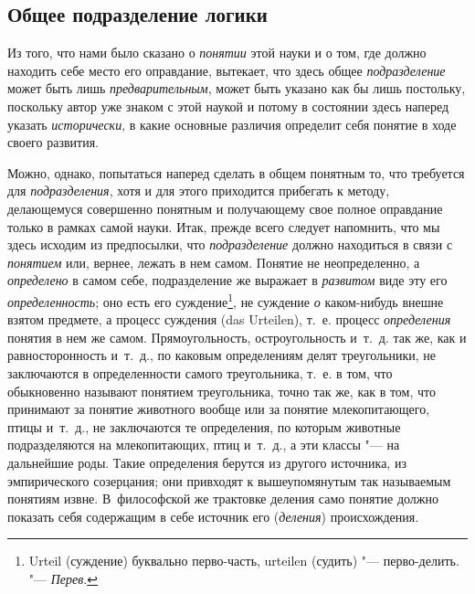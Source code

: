 \subsection[\hspace{8mm}Общее подразделение логики]{Общее подразделение логики}
Из того, что нами было сказано о
{\em понятии} этой науки и о том, где должно находить
себе место его оправдание, вытекает, что здесь общее
{\em подразделение} может быть лишь
{\em предварительным}, может быть указано как бы лишь
постольку, поскольку автор уже знаком с этой наукой и потому в состоянии
здесь наперед указать {\em исторически}, в какие
основные различия определит себя понятие в ходе своего развития.

Можно, однако, попытаться наперед сделать в общем понятным то, что требуется
для {\em подразделения}, хотя и для этого приходится
прибегать к методу, делающемуся совершенно понятным и получающему свое
полное оправдание только в рамках самой науки. Итак, прежде всего следует
напомнить, что мы здесь исходим из предпосылки, что
{\em подразделение} должно находиться в связи с
{\em понятием} или, вернее, лежать в нем самом. Понятие
не неопределенно, а {\em определено} в самом себе,
подразделение же выражает в {\em развитом} виде эту его
{\em определенность}; оно есть его суждение\footnote{
Urteil (суждение) буквально перво-часть, urteilen (судить) "--- перво-делить.
"--- {\em Перев}.}, не суждение {\em о} каком-нибудь
внешне взятом предмете, а процесс суждения (das Urteilen), т.~е. процесс
{\em определения} понятия в нем же самом.
Прямоугольность, остроугольность и~т.~д. так же, как и равносторонность
и~т.~д., по каковым определениям делят треугольники, не заключаются в
определенности самого треугольника, т.~е. в том, что обыкновенно называют
понятием треугольника, точно так же, как в том, что принимают за понятие
животного вообще или за понятие млекопитающего, птицы и~т.~д., не
заключаются те определения, по которым животные подразделяются на
млекопитающих, птиц и~т.~д., а эти классы "--- на дальнейшие роды. Такие
определения берутся из другого источника, из эмпирического созерцания; они
привходят к вышеупомянутым так называемым понятиям извне. В~философской же
трактовке деления само понятие должно показать себя содержащим в себе
источник его ({\em деления}) происхождения.

